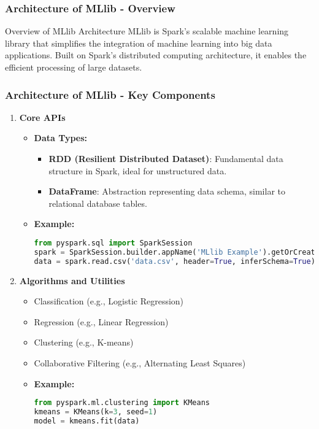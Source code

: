 \documentclass[aspectratio=169]{beamer}
\begin{document}
\begin{frame}[fragile]
    \frametitle{Architecture of MLlib - Overview}
    \begin{block}{Overview of MLlib Architecture}
        MLlib is Spark's scalable machine learning library that simplifies the integration of machine learning into big data applications. Built on Spark's distributed computing architecture, it enables the efficient processing of large datasets.
    \end{block}
\end{frame}

\begin{frame}[fragile]
    \frametitle{Architecture of MLlib - Key Components}
    \begin{enumerate}
        \item \textbf{Core APIs}
            \begin{itemize}
                \item \textbf{Data Types:}
                    \begin{itemize}
                        \item \textbf{RDD (Resilient Distributed Dataset)}: Fundamental data structure in Spark, ideal for unstructured data.
                        \item \textbf{DataFrame}: Abstraction representing data schema, similar to relational database tables.
                    \end{itemize}
                \item \textbf{Example:}
                    \begin{lstlisting}[language=Python]
from pyspark.sql import SparkSession
spark = SparkSession.builder.appName('MLlib Example').getOrCreate()
data = spark.read.csv('data.csv', header=True, inferSchema=True)
                    \end{lstlisting}
            \end{itemize}

        \item \textbf{Algorithms and Utilities}
            \begin{itemize}
                \item Classification (e.g., Logistic Regression)
                \item Regression (e.g., Linear Regression)
                \item Clustering (e.g., K-means)
                \item Collaborative Filtering (e.g., Alternating Least Squares)
                \item \textbf{Example:}
                    \begin{lstlisting}[language=Python]
from pyspark.ml.clustering import KMeans
kmeans = KMeans(k=3, seed=1)
model = kmeans.fit(data)
                    \end{lstlisting}
            \end{itemize}
    \end{enumerate}
\end{frame}
\end{document}
